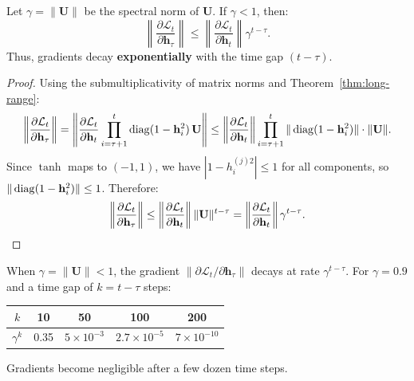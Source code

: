 \documentclass[11pt,a4paper]{article}
\begin{document}
\begin{theorem}
\label{thm:vanishing}
Let $\gamma = \|\mathbf{U}\|$ be the spectral norm of $\mathbf{U}$.
If $\gamma < 1$, then:
\begin{equation}
  \left\|\frac{\partial \mathcal{L}_t}{\partial \mathbf{h}_\tau}
  \right\| \leq \left\|\frac{\partial \mathcal{L}_t}
    {\partial \mathbf{h}_t}\right\| \gamma^{t - \tau}.
  \label{eq:vanishing}
\end{equation}
Thus, gradients decay \textbf{exponentially} with the time gap
$(t - \tau)$.
\end{theorem}

\begin{proof}
Using the submultiplicativity of matrix norms and
Theorem~\ref{thm:long-range}:
\[
  \left\|\frac{\partial \mathcal{L}_t}{\partial \mathbf{h}_\tau}
  \right\| = \left\|\frac{\partial \mathcal{L}_t}
    {\partial \mathbf{h}_t}
    \prod_{i=\tau+1}^{t} \operatorname{diag}(1 - \mathbf{h}_i^2)\,
    \mathbf{U}\right\|
  \leq \left\|\frac{\partial \mathcal{L}_t}
    {\partial \mathbf{h}_t}\right\|
    \prod_{i=\tau+1}^{t} \|\operatorname{diag}(1 - \mathbf{h}_i^2)\|
    \cdot \|\mathbf{U}\|.
\]
Since $\tanh$ maps to $(-1, 1)$, we have
$|1 - h_i^{(j)2}| \leq 1$ for all components, so
$\|\operatorname{diag}(1 - \mathbf{h}_i^2)\| \leq 1$.  Therefore:
\[
  \left\|\frac{\partial \mathcal{L}_t}{\partial \mathbf{h}_\tau}
  \right\| \leq \left\|\frac{\partial \mathcal{L}_t}
    {\partial \mathbf{h}_t}\right\| \|\mathbf{U}\|^{t-\tau}
    = \left\|\frac{\partial \mathcal{L}_t}
    {\partial \mathbf{h}_t}\right\| \gamma^{t-\tau}.  \qedhere
\]
\end{proof}

\begin{keyresult}[title={Vanishing Gradient Bound}]
When $\gamma = \|\mathbf{U}\| < 1$, the gradient
$\|\partial \mathcal{L}_t / \partial \mathbf{h}_\tau\|$ decays at
rate $\gamma^{t-\tau}$.  For $\gamma = 0.9$ and a time gap of
$k = t - \tau$ steps:
\begin{center}
\begin{tabular}{ccccc}
\toprule
$k$ & 10 & 50 & 100 & 200 \\
\midrule
$\gamma^k$ & 0.35 & $5 \times 10^{-3}$ & $2.7 \times 10^{-5}$
  & $7 \times 10^{-10}$ \\
\bottomrule
\end{tabular}
\end{center}
Gradients become negligible after a few dozen time steps.
\end{keyresult}
\end{document}
